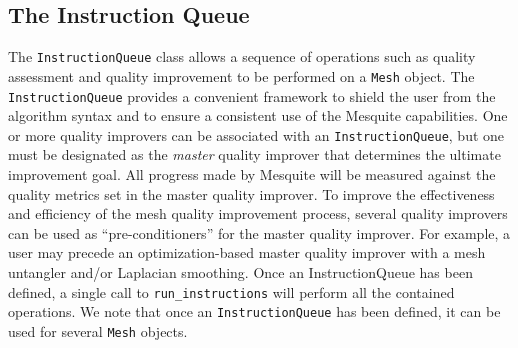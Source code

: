 

\subsection{The Instruction Queue} \label{sec:IQ}

The \texttt{InstructionQueue} class allows a sequence of operations
such as quality assessment and quality improvement to be performed on
a \texttt{Mesh} object. The \texttt{InstructionQueue} 
provides a convenient framework to shield the user
from the algorithm syntax and to ensure a consistent use of the
Mesquite capabilities.  One or more quality improvers can be
associated with an {\tt InstructionQueue}, but one must be designated
as the {\it master} quality improver that determines the ultimate 
improvement goal.  All progress made by Mesquite will be
measured against the quality metrics set in the master quality
improver.  To improve the effectiveness and efficiency of the mesh
quality improvement process, several quality improvers can be used as
``pre-conditioners'' for the master quality improver.  For example, a
user may precede an optimization-based master quality improver with a
mesh untangler and/or Laplacian smoothing.  Once an
InstructionQueue has been defined, a single call to \texttt{run\_instructions} 
will perform all the contained operations.  We note
that once an \texttt{InstructionQueue} has been defined, it can be used
for several \texttt{Mesh} objects.



